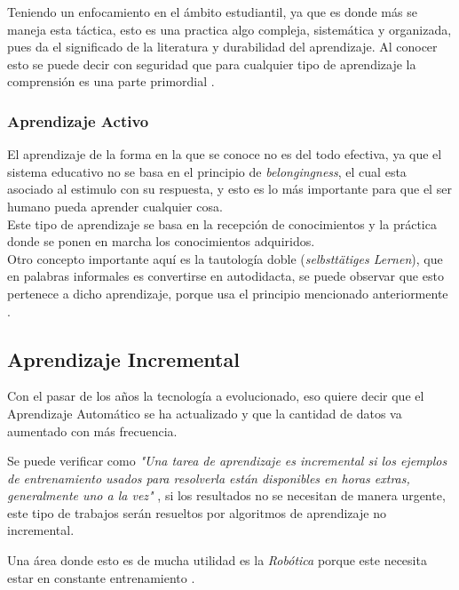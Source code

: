             Teniendo un enfocamiento en el \'ambito estudiantil, ya que es donde m\'as se maneja esta t\'actica, esto es una
            practica algo compleja, sistemática y organizada, pues da el significado de la literatura y durabilidad del aprendizaje.
            Al conocer esto se puede decir con seguridad que para cualquier tipo de aprendizaje la comprensi\'on es 
            una parte primordial \cite{perez2014}.

        \subsubsection{Aprendizaje Activo}
        	
        	
            El aprendizaje de la forma en la que se conoce no es del todo efectiva, ya que el sistema educativo
            no se basa en el principio de \textit{belongingness}, el cual esta asociado al estimulo con su respuesta,
            y esto es lo m\'as importante para que el ser humano pueda aprender cualquier cosa.\\
            
            Este tipo de aprendizaje se basa en la recepci\'on de conocimientos y la pr\'actica donde se ponen en marcha los conocimientos adquiridos.\\
            Otro concepto importante aqu\'i es la tautolog\'ia doble (\textit{selbstt\"atiges Lernen}), que en palabras informales es convertirse en autodidacta, 
            se puede observar que esto pertenece a dicho aprendizaje, porque usa el principio mencionado anteriormente \cite{Huber2008}.

 \subsection{Aprendizaje Incremental}
 	
 	
 	Con el pasar de los años la tecnología a evolucionado, eso quiere decir que el Aprendizaje Automático se ha actualizado y que la 
        cantidad de datos va aumentado con más frecuencia.
        
        Se puede verificar como \textit{"Una tarea de aprendizaje es incremental si los ejemplos de entrenamiento usados para 
        resolverla están disponibles en horas extras, generalmente uno a la vez"} \cite{GiraudCarrier2000}, si los resultados no se 
        necesitan de manera urgente, este tipo de trabajos serán resueltos por algoritmos de aprendizaje no incremental. 

        Una área donde esto es de mucha utilidad es la \textit{Rob\'otica} porque este necesita estar en constante entrenamiento \cite{GiraudCarrier2000}.

